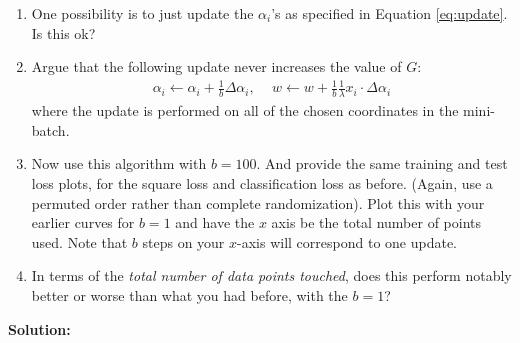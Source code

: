 \documentclass{article}
\newcommand{\solution}{\textbf{\vskip 0.2cm \large Solution:\\}}
\begin{document}
\begin{enumerate}
	\item One possibility is to just update the $\alpha_i$'s as specified in Equation \eqref{eq:update}. Is this ok?
	\item Argue that the following update never increases the value of $G$:
	\begin{align}
		\alpha_i \leftarrow \alpha_i+\frac{1}{b}\Delta\alpha_i, \, \quad w \leftarrow
		w+\frac{1}{b}\frac{1}{\lambda}x_i \cdot \Delta\alpha_i
	\end{align}
	where the update is performed on all of the chosen coordinates in the mini-batch.
	\item  Now use this algorithm with $b=100$. And provide the same training and test loss plots, for the square loss and classification loss as before. (Again, use a permuted order rather than complete randomization). Plot this with your earlier curves for $b=1$ and have the $x$ axis be the total number of points used. Note that $b$ steps on your $x$-axis will correspond to one update.
	\item In terms of the \emph{total number of data points touched}, does this perform notably better or worse than what you had before, with the $b=1$?
\end{enumerate}

\solution
\end{document}
